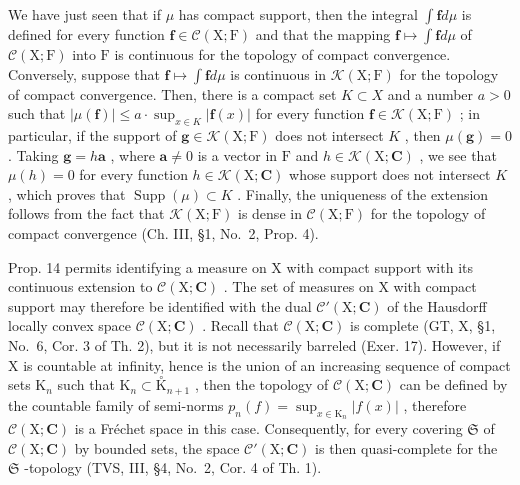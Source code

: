 We have just seen that if \(\mu\) has compact support, then the integral \(\int \mathbf{f}d\mu\) is defined for every function \(\mathbf{f}\in \mathcal{C}(\mathrm{X};\mathrm{F})\) and that the mapping \(\mathbf{f}\mapsto \int \mathbf{f}d\mu\) of \(\mathcal{C}(\mathrm{X};\mathrm{F})\) into \(\mathrm{F}\) is continuous for the topology of compact convergence. Conversely, suppose that \(\mathbf{f}\mapsto \int \mathbf{f}d\mu\) is continuous in \(\mathcal{K}(\mathrm{X};\mathrm{F})\) for the topology of compact convergence. Then, there is a compact set \(K\subset X\) and a number \(a > 0\) such that \(|\mu (\mathbf{f})|\leqslant a\cdot \sup_{x\in K}|\mathbf{f}(x)|\) for every function \(\mathbf{f}\in \mathcal{K}(\mathrm{X};\mathrm{F})\) ; in particular, if the support of \(\mathbf{g}\in \mathcal{K}(\mathrm{X};\mathrm{F})\) does not intersect \(K\) , then \(\mu (\mathbf{g}) = 0\) . Taking \(\mathbf{g} = h\mathbf{a}\) , where \(\mathbf{a}\neq 0\) is a vector in \(\mathrm{F}\) and \(h\in \mathcal{K}(\mathrm{X};\mathbf{C})\) , we see that \(\mu (h) = 0\) for every function \(h\in \mathcal{K}(\mathrm{X};\mathbf{C})\) whose support does not intersect \(K\) , which proves that \(\operatorname {Supp}(\mu)\subset K\) . Finally, the uniqueness of the extension follows from the fact that \(\mathcal{K}(\mathrm{X};\mathrm{F})\) is dense in \(\mathcal{C}(\mathrm{X};\mathrm{F})\) for the topology of compact convergence (Ch. III, §1, No.~2, Prop. 4).

Prop. 14 permits identifying a measure on X with compact support with its continuous extension to \(\mathcal{C}(\mathrm{X};\mathbf{C})\) . The set of measures on X with compact support may therefore be identified with the dual \(\mathcal{C}'(\mathrm{X};\mathbf{C})\) of the Hausdorff locally convex space \(\mathcal{C}(\mathrm{X};\mathbf{C})\) . Recall that \(\mathcal{C}(\mathrm{X};\mathbf{C})\) is complete (GT, X, §1, No.~6, Cor. 3 of Th. 2), but it is not necessarily barreled (Exer. 17). However, if X is countable at infinity, hence is the union of an increasing sequence of compact sets \(\mathrm{K}_n\) such that \(\mathrm{K}_n \subset \overset{\circ}{\mathrm{K}}_{n+1}\) , then the topology of \(\mathcal{C}(\mathrm{X};\mathbf{C})\) can be defined by the countable family of semi-norms \(p_n(f) = \sup_{x \in \mathrm{K}_n} |f(x)|\) , therefore \(\mathcal{C}(\mathrm{X};\mathbf{C})\) is a Fréchet space in this case. Consequently, for every covering \(\mathfrak{S}\) of \(\mathcal{C}(\mathrm{X};\mathbf{C})\) by bounded sets, the space \(\mathcal{C}'(\mathrm{X};\mathbf{C})\) is then quasi-complete for the \(\mathfrak{S}\) -topology (TVS, III, §4, No.~2, Cor. 4 of Th. 1).

